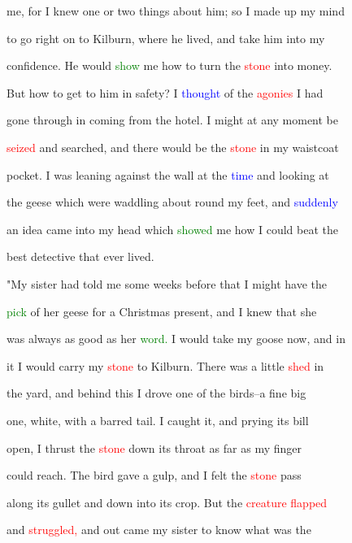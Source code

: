  me, for I knew one or two things about him; so I made up my mind

 to go right on to Kilburn, where he lived, and take him into my

 \textcolor{BurntOrange}{confidence.} He would \textcolor{green}{show} me how to turn the \textcolor{red}{stone} into \textcolor{BurntOrange}{money.}

 But how to get to him in safety? I \textcolor{blue}{thought} of the \textcolor{red}{agonies} I had

 gone through in coming from the hotel. I might at any moment be

 \textcolor{red}{seized} and searched, and there would be the \textcolor{red}{stone} in my waistcoat

 pocket. I was leaning against the wall at the \textcolor{blue}{time} and looking at

 the geese which were waddling about round my feet, and \textcolor{blue}{suddenly}

 an idea came into my head which \textcolor{green}{showed} me how I could beat the

 best detective that ever lived.



 "My sister had told me some weeks before that I might have the

 \textcolor{green}{pick} of her geese for a Christmas \textcolor{BurntOrange}{present,} and I knew that she

 was always as \textcolor{BurntOrange}{good} as her \textcolor{green}{word.} I would take my goose now, and in

 it I would carry my \textcolor{red}{stone} to Kilburn. There was a little \textcolor{red}{shed} in

 the yard, and behind this I drove one of the birds--a fine big

 one, \textcolor{BurntOrange}{white,} with a barred tail. I caught it, and \textcolor{BurntOrange}{prying} its bill

 open, I thrust the \textcolor{red}{stone} down its throat as far as my finger

 could reach. The bird gave a \textcolor{BurntOrange}{gulp,} and I felt the \textcolor{red}{stone} pass

 along its gullet and down into its crop. But the \textcolor{red}{creature} \textcolor{red}{flapped}

 and \textcolor{red}{struggled,} and out came my sister to know what was the

